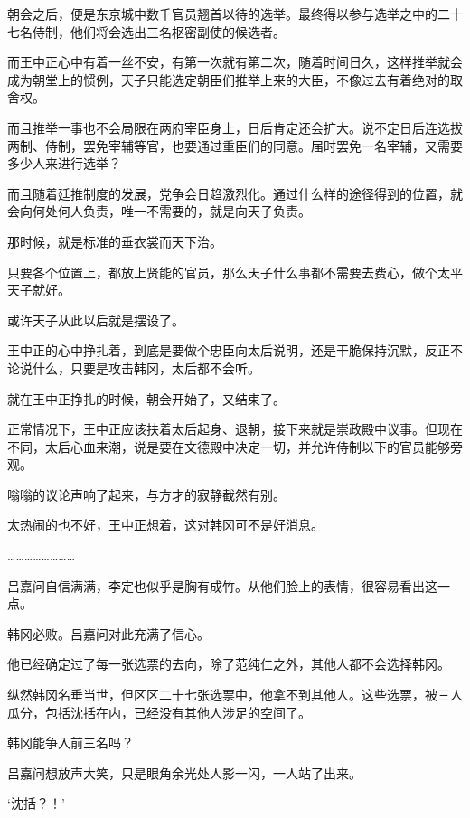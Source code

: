 朝会之后，便是东京城中数千官员翘首以待的选举。最终得以参与选举之中的二十七名侍制，他们将会选出三名枢密副使的候选者。

而王中正心中有着一丝不安，有第一次就有第二次，随着时间日久，这样推举就会成为朝堂上的惯例，天子只能选定朝臣们推举上来的大臣，不像过去有着绝对的取舍权。

而且推举一事也不会局限在两府宰臣身上，日后肯定还会扩大。说不定日后连选拔两制、侍制，罢免宰辅等官，也要通过重臣们的同意。届时罢免一名宰辅，又需要多少人来进行选举？

而且随着廷推制度的发展，党争会日趋激烈化。通过什么样的途径得到的位置，就会向何处何人负责，唯一不需要的，就是向天子负责。

那时候，就是标准的垂衣裳而天下治。

只要各个位置上，都放上贤能的官员，那么天子什么事都不需要去费心，做个太平天子就好。

或许天子从此以后就是摆设了。

王中正的心中挣扎着，到底是要做个忠臣向太后说明，还是干脆保持沉默，反正不论说什么，只要是攻击韩冈，太后都不会听。

就在王中正挣扎的时候，朝会开始了，又结束了。

正常情况下，王中正应该扶着太后起身、退朝，接下来就是崇政殿中议事。但现在不同，太后心血来潮，说是要在文德殿中决定一切，并允许侍制以下的官员能够旁观。

嗡嗡的议论声响了起来，与方才的寂静截然有别。

太热闹的也不好，王中正想着，这对韩冈可不是好消息。

……………………

吕嘉问自信满满，李定也似乎是胸有成竹。从他们脸上的表情，很容易看出这一点。

韩冈必败。吕嘉问对此充满了信心。

他已经确定过了每一张选票的去向，除了范纯仁之外，其他人都不会选择韩冈。

纵然韩冈名垂当世，但区区二十七张选票中，他拿不到其他人。这些选票，被三人瓜分，包括沈括在内，已经没有其他人涉足的空间了。

韩冈能争入前三名吗？

吕嘉问想放声大笑，只是眼角余光处人影一闪，一人站了出来。

‘沈括？！’

